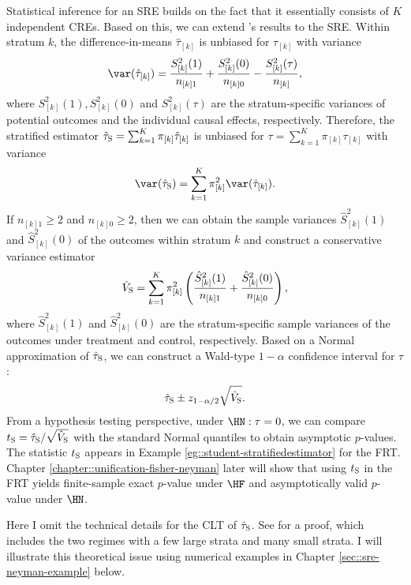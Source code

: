 Statistical inference for an SRE builds on the fact that it essentially consists of $K$ independent CREs. Based on this, we can extend \citet{Neyman:1923}'s results to the SRE.  Within stratum $k$, the difference-in-means $\hat{\tau}_{[k]}$ is unbiased for $\tau_{[k]}$ with variance
$$
\var ( \hat{\tau}_{[k]}) =  \frac{S_{[k]}^2(1)}{ n_{[k]1} } +  \frac{S_{[k]}^2(0)}{ n_{[k]0} }
- \frac{  S_{[k]}^2(\tau) }{ n_{[k]} },
$$
where $ S_{[k]}^2(1), S_{[k]}^2(0)$ and $S_{[k]}^2(\tau)$ are the stratum-specific variances of potential outcomes and the individual causal effects, respectively. 
Therefore, the stratified estimator $\hat{\tau}_\textsc{S} = \sum_{k=1}^K  \pi_{[k]} \hat{\tau}_{[k]}$ is unbiased for $\tau =\sum_{k=1}^K  \pi_{[k]}  \tau_{[k]} $ with variance
$$
\var( \hat{\tau}_\textsc{S}   ) = \sum_{k=1}^K  \pi_{[k]}^2   \var ( \hat{\tau}_{[k]}).
$$
If $n_{[k]1} \geq 2$ and $n_{[k]0} \geq 2$, then we can obtain the sample variances $\hat{S}_{[k]}^2(1)$ and $\hat{S}_{[k]}^2(0)$ of the outcomes within stratum $k$ and construct a conservative variance estimator
$$
\hat{V}_\textsc{S}  = \sum_{k=1}^K  \pi_{[k]}^2 \left(  \frac{\hat{S}_{[k]}^2(1)}{ n_{[k]1} } +  \frac{ \hat{S}_{[k]}^2(0)}{ n_{[k]0} } \right), 
$$  
where $\hat{S}_{[k]}^2(1)$ and $\hat{S}_{[k]}^2(0)$ are the stratum-specific sample variances of the outcomes under treatment and control, respectively. Based on a Normal approximation of $\hat{\tau}_\textsc{S} $, we can construct a Wald-type $1-\alpha$ confidence interval for $\tau$:
$$
\hat{\tau}_\textsc{S} \pm z_{1-\alpha/2} \sqrt{  \hat{V}_\textsc{S}  } . 
$$
From a hypothesis testing perspective, under $\HN: \tau=0$, we can compare $t_\textsc{S} =   \hat{\tau}_\textsc{S} / \sqrt{  \hat{V}_\textsc{S}  }$ with the standard Normal quantiles to obtain asymptotic $p$-values. The statistic $t_\textsc{S} $ appears in Example \ref{eg::student-stratifiedestimator} for the FRT. Chapter \ref{chapter::unification-fisher-neyman} later will show that using  $t_\textsc{S} $ in the FRT yields finite-sample exact $p$-value under $\HF$  and asymptotically valid $p$-value under $\HN$. 



Here I omit the technical details for the CLT of $\hat{\tau}_\textsc{S} $. See \citet{liu2020regression} for a proof,  which includes the two regimes with a few large strata and many small strata. I will illustrate this theoretical issue using numerical examples in Chapter \ref{sec::sre-neyman-example} below. 






